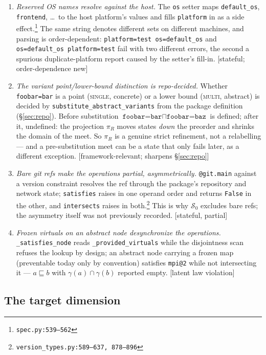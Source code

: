 \documentclass[11pt]{article}
\theoremstyle{definition}
\theoremstyle{remark}
\newcommand{\sat}{\sqsubseteq}
\newcommand{\meet}{\sqcap}
\newcommand{\den}[1]{\gamma(#1)}
\newcommand{\Spec}{\mathcal{S}}
\newcommand{\code}[1]{\texttt{#1}}
\newcommand{\src}[1]{\footnote{\code{#1}}}
\begin{document}
\begin{enumerate}[itemsep=3pt]
\item \emph{Reserved OS names resolve against the host.}  The \code{os}
setter maps \code{default\_os}, \code{frontend}, \dots\ to the host
platform's values and fills \code{platform} in as a side
effect.\src{spec.py:539--562}  The same string denotes different sets on
different machines, and parsing is order-dependent:
\code{platform=test os=default\_os} and \code{os=default\_os platform=test}
fail with two different errors, the second a spurious duplicate-platform
report caused by the setter's fill-in.  [stateful; order-dependence new]
\item \emph{The variant point/lower-bound distinction is repo-decided.}
Whether \code{foobar=bar} is a point (\textsc{single}, concrete) or a lower
bound (\textsc{multi}, abstract) is decided by
\code{substitute\_abstract\_variants} from the package definition
(\S\ref{sec:repo}).  Before substitution
$\code{foobar=bar} \meet \code{foobar=baz}$ is defined; after it, undefined:
the projection $\pi_R$ moves states \emph{down} the preorder and shrinks the
domain of the meet.  So $\pi_R$ is a genuine strict refinement, not a
relabelling --- and a pre-substitution meet can be a state that only fails
later, as a different exception.  [framework-relevant; sharpens
\S\ref{sec:repo}]
\item \emph{Bare git refs make the operations partial, asymmetrically.}
\code{@git.main} against a version constraint resolves the ref through the
package's repository and network state; \code{satisfies} raises in one
operand order and returns \code{False} in the other, and \code{intersects}
raises in both.\src{version\_types.py:589--637, 878--896}  This is why
$\Spec_0$ excludes bare refs; the asymmetry itself was not previously
recorded.  [stateful, partial]
\item \emph{Frozen virtuals on an abstract node desynchronize the
operations.}  \code{\_satisfies\_node} reads \code{\_provided\_virtuals}
while the disjointness scan refuses the lookup by design; an abstract node
carrying a frozen map (preventable today only by convention) satisfies
\code{mpi@2} while not intersecting it --- $a \sat b$ with
$\den{a} \cap \den{b}$ reported empty.  [latent law violation]
\end{enumerate}

\subsection{The target dimension}\label{sec:audit-target}
\end{document}
